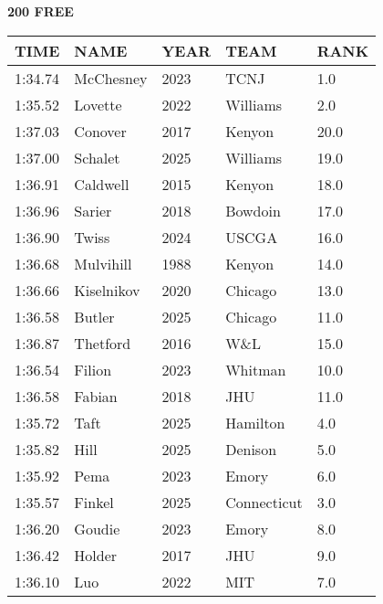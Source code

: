 \begin{minipage}[t]{0.48\textwidth}
\centering
\textbf{200 FREE}\\[0.05cm]
\begin{tabular}{@{}p{1.8cm}p{2.8cm}p{1.2cm}p{1.4cm}p{0.8cm}@{}}
\hline
\textbf{TIME} & \textbf{NAME} & \textbf{YEAR} & \textbf{TEAM} & \textbf{RANK} \\
\hline
1:34.74 & McChesney & 2023 & TCNJ & 1.0 \\
1:35.52 & Lovette & 2022 & Williams & 2.0 \\
1:37.03 & Conover & 2017 & Kenyon & 20.0 \\
1:37.00 & Schalet & 2025 & Williams & 19.0 \\
1:36.91 & Caldwell & 2015 & Kenyon & 18.0 \\
1:36.96 & Sarier & 2018 & Bowdoin & 17.0 \\
1:36.90 & Twiss & 2024 & USCGA & 16.0 \\
1:36.68 & Mulvihill & 1988 & Kenyon & 14.0 \\
1:36.66 & Kiselnikov & 2020 & Chicago & 13.0 \\
1:36.58 & Butler & 2025 & Chicago & 11.0 \\
1:36.87 & Thetford & 2016 & W\&L & 15.0 \\
1:36.54 & Filion & 2023 & Whitman & 10.0 \\
1:36.58 & Fabian & 2018 & JHU & 11.0 \\
1:35.72 & Taft & 2025 & Hamilton & 4.0 \\
1:35.82 & Hill & 2025 & Denison & 5.0 \\
1:35.92 & Pema & 2023 & Emory & 6.0 \\
1:35.57 & Finkel & 2025 & Connecticut & 3.0 \\
1:36.20 & Goudie & 2023 & Emory & 8.0 \\
1:36.42 & Holder & 2017 & JHU & 9.0 \\
1:36.10 & Luo & 2022 & MIT & 7.0 \\
\hline
\end{tabular}
\end{minipage}\hfill
